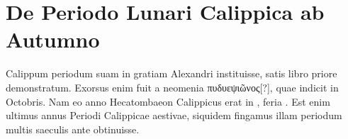 
\bigskip %



\section{De Periodo Lunari Calippica ab Autumno}
Calippum periodum suam in gratiam Alexandri instituisse,
satis libro priore demonstratum.
Exorsus enim fuit a neomenia
\textgreek{πυδυεψιῶνος[?]}, quae indicit in  Octobris.
Nam eo anno
Hecatombaeon Calippicus erat in , feria .
Est enim ultimus
annus Periodi Calippicae aestivae, siquidem fingamus illam periodum
multis saeculis ante obtinuisse.
\begin{table}[htbp]
  
\end{table}

